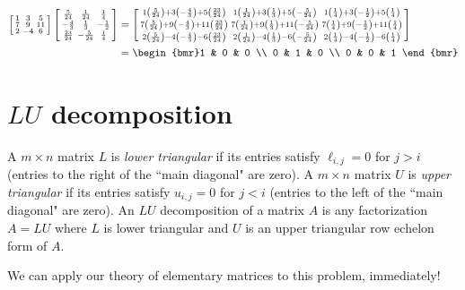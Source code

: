 \documentclass[m3380-lec-main.tex]{subfiles}
\begin{document}
\begin{exmp}
\begin{align*}
	\left[\begin{smallmatrix} 
		1 & 3 & 5 \\
		7 & 9 & 11 \\
		2 & -4 & 6
	\end{smallmatrix}\right]
	\left[\begin{smallmatrix} 
		\frac5{24} & \frac1{24} & \frac14 \\
		-\frac43 & \frac13 & -\frac12 \\
		\frac{23}{24} & -\frac5{24} & \frac14
	\end{smallmatrix}\right] &=
	\left[\begin{smallmatrix}
	1\left(\frac5{24}\right)+3\left(-\frac43\right)+5\left(\frac{23}{24}\right) & 
	1\left(\frac1{24}\right)+3\left(\frac13\right)+5\left(-\frac5{24}\right) &
	1\left(\frac14\right)+3\left(-\frac12\right)+5\left(\frac14\right) \\
%
	7\left(\frac5{24}\right)+9\left(-\frac43\right)+11\left(\frac{23}{24}\right) & 
	7\left(\frac1{24}\right)+9\left(\frac13\right)+11\left(-\frac5{24}\right) &
	7\left(\frac14\right)+9\left(-\frac12\right)+11\left(\frac14\right) \\
%
	2\left(\frac5{24}\right)-4\left(-\frac43\right)-6\left(\frac{23}{24}\right) & 
	2\left(\frac1{24}\right)-4\left(\frac13\right)-6\left(-\frac5{24}\right) &
	2\left(\frac14\right)-4\left(-\frac12\right)-6\left(\frac14\right) \\
%
	\end{smallmatrix}\right] \\
	&=
	\begin{bmr}1 & 0 & 0 \\ 0 & 1 & 0 \\ 0 & 0 & 1 \end{bmr}
\end{align*}
\end{exmp}
\section{$LU$ decomposition} 
\begin{defn} A $m\times n$ matrix $L$ is \emph{lower triangular} if its entries satisfy $\ell_{i,j}=0$ for $j>i$ (entries to the right of the ``main diagonal" are zero). A $m\times n$ matrix $U$ is \emph{upper triangular} if its entries satisfy $u_{i,j} = 0$ for $j<i$ (entries to the left of the ``main diagonal" are zero). An $LU$ decomposition of a matrix $A$ is any factorization $A=LU$ where $L$ is lower triangular and $U$ is an upper triangular row echelon form of $A$.
\end{defn}
We can apply our theory of elementary matrices to this problem, immediately!
\end{document}
